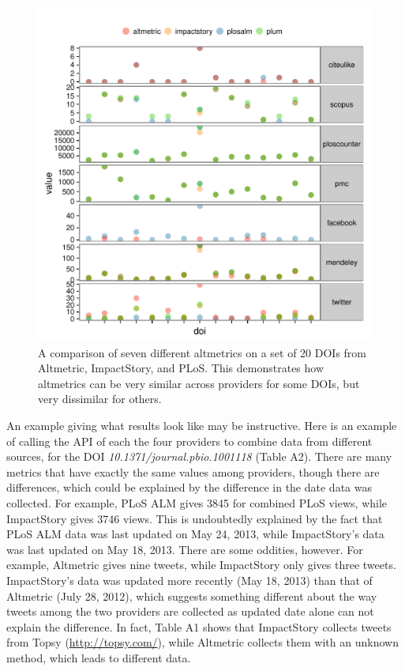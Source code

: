 \documentclass[letterpaper,superscriptaddress,showkeys,longbibliography]{revtex4-1}\usepackage{graphicx, color}
\newenvironment{knitrout}{}{} %
\begin{document}
\begin{knitrout}
\color{fgcolor}\begin{figure}[]


{\centering \includegraphics[width=.7\linewidth]{figure/dataconst2} 

}

\caption[A comparison of seven different altmetrics on a set of 20 DOIs from Altmetric, ImpactStory, and PLoS]{A comparison of seven different altmetrics on a set of 20 DOIs from Altmetric, ImpactStory, and PLoS. This demonstrates how altmetrics can be very similar across providers for some DOIs, but very dissimilar for others.\label{fig:dataconst2}}
\end{figure}


\end{knitrout}


An example giving what results look like may be instructive. Here is an example of calling the API of each the four providers to combine data from different sources, for the DOI \emph{10.1371/journal.pbio.1001118} \cite{arslan2011} (Table A2). There are many metrics that have exactly the same values among providers, though there are differences, which could be explained by the difference in the date data was collected. For example, PLoS ALM gives 3845 for combined PLoS views, while ImpactStory gives 3746 views. This is undoubtedly explained by the fact that PLoS ALM data was last updated on May 24, 2013, while ImpactStory's data was last updated on May 18, 2013. There are some oddities, however. For example, Altmetric gives nine tweets, while ImpactStory only gives three tweets. ImpactStory's data was updated more recently (May 18, 2013) than that of Altmetric (July 28, 2012), which suggests something different about the way tweets among the two providers are collected as updated date alone can not explain the difference. In fact, Table A1 shows that ImpactStory collects tweets from Topsy (\url{http://topsy.com/}), while Altmetric collects them with an unknown method, which leads to different data.
\end{document}
